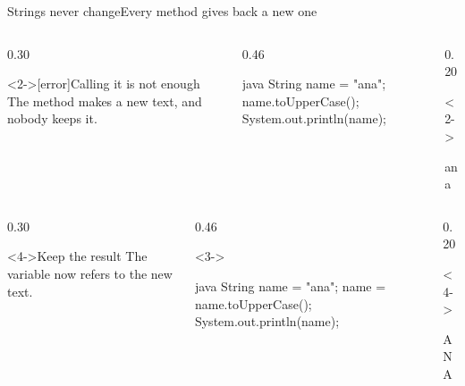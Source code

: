 \documentclass[\deckoptions]{beamer}
\begin{document}
\begin{frame}[fragile]{Strings never change}{Every method gives back a new one}
  \begin{boxrow}
  \begin{columns}[c, onlytextwidth]
    \begin{column}{0.30\textwidth}
      \begin{card}<2->[error]{Calling it is not enough}
        The method makes a new text, and nobody keeps it.
      \end{card}
    \end{column}
    \begin{column}{0.46\textwidth}
\begin{codeblock}{java}
String name = "ana";
name.toUpperCase();
System.out.println(name);
\end{codeblock}
    \end{column}
    \begin{column}{0.20\textwidth}
      \begin{uncoverenv}<2->
\begin{console}
ana
\end{console}
      \end{uncoverenv}
    \end{column}
  \end{columns}
  \end{boxrow}
  \boxrowgap
  \begin{boxrow}
  \begin{columns}[c, onlytextwidth]
    \begin{column}{0.30\textwidth}
      \begin{card}<4->{Keep the result}
        The variable now refers to the new text.
      \end{card}
    \end{column}
    \begin{column}{0.46\textwidth}
      \begin{uncoverenv}<3->
\begin{codeblock}{java}
String name = "ana";
name = name.toUpperCase();
System.out.println(name);
\end{codeblock}
      \end{uncoverenv}
    \end{column}
    \begin{column}{0.20\textwidth}
      \begin{uncoverenv}<4->
\begin{console}
ANA
\end{console}

\end{uncoverenv}
\end{column}
\end{columns}
\end{boxrow}
\end{frame}
\end{document}
